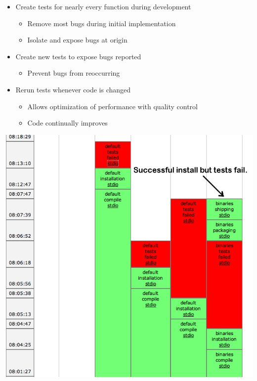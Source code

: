 \documentclass[pdftex,cig,slideColor]{pp4slides}
\begin{document}
 
 \begin{itemize}
 \item Create tests for nearly every function during development
   \begin{itemize}
   \item Remove most bugs during initial implementation
   \item Isolate and expose bugs at origin
   \end{itemize}
 \item Create new tests to expose bugs reported
   \begin{itemize}
   \item Prevent bugs from reoccurring
   \end{itemize}
 \item Rerun tests whenever code is changed
   \begin{itemize}
   \item Allows optimization of performance with quality control
   \item Code continually improves
   \end{itemize}
 \end{itemize}
  

 \begin{center}
   \includegraphics[scale=0.68]{figs/buildbotfail}
 \end{center}
  
\end{document}
